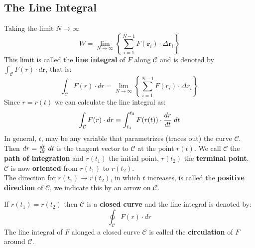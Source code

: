 \documentclass[a4paper, 10pt]{article}
\begin{document}
\subsection{The Line Integral}
Taking the limit $N \to \infty$
$$W = \lim_{N \to \infty} \left\{ \sum_{i=1}^{N-1} F(\mathbf{r}_i) \cdot \Delta \mathbf{r}_i \right\}$$
This limit is called the \textbf{line integral} of $F$ along $\mathcal{C}$ and is denoted by $\int_{\mathcal{C}} F(r)\cdot d\mathbf{r}$, that is:
$$\int_{\mathcal{C}} F(r) \cdot dr = \lim_{N \to \infty} \left\{ \sum_{i=1}^{N-1}F(r_i)\cdot \Delta r_i \right\}$$
Since $r = r(t)$ we can calculate the line integral as:
$$\int_{\mathcal{C}} F(r) \cdot dr = \int_{t_1}^{t_2} F(r(t)) \cdot \frac{dr}{dt} \; dt$$
In general, $t$, may be any variable that parametrizes (traces out) the curve $\mathcal{C}$. Then $dr = \frac{dr}{dt} \; dt$ is the tangent vector to $\mathcal{C}$ at the point $r(t)$. We call $\mathcal{C}$ the \textbf{path of integration} and $r(t_1)$ the initial point, $r(t_2)$ the \textbf{terminal point}. $\mathcal{C}$ is now \textbf{oriented} from $r(t_1)$ to $r(t_2)$. \\
The direction for $r(t_1) \to r(t_2)$, in which $t$ increases, is called the \textbf{positive direction} of $\mathcal{C}$, we indicate this by an arrow on $\mathcal{C}$.

\begin{center}
\end{center}
If $r(t_1) = r(t_2)$ then $\mathcal{C}$ is a \textbf{closed curve} and the line integral is denoted by:
$$\oint_{\mathcal{C}} F(r) \cdot dr$$
The line integral of $F$ alonged a closed curve $\mathcal{C}$ is called the \textbf{circulation} of $F$ around $\mathcal{C}$.
\end{document}
